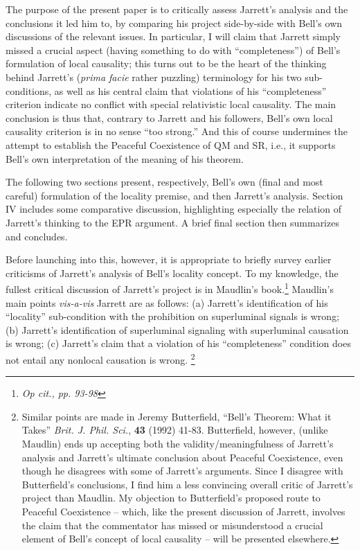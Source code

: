 \documentclass[12pt]{article}
\begin{document}
The purpose of the present paper is to critically assess
Jarrett's analysis and
the conclusions it led him to, by comparing his project side-by-side
with Bell's own discussions of the relevant issues.  In particular, I
will claim that Jarrett simply missed a crucial aspect (having
something to do with ``completeness'') of Bell's
formulation of local causality; this turns out to be the heart of the
thinking behind Jarrett's (\emph{prima facie} rather puzzling) terminology
for his two sub-conditions, as well as his central claim that
violations of his ``completeness'' criterion indicate no conflict with
special relativistic local causality.  The main conclusion is thus
that, contrary to Jarrett and his followers, Bell's own local 
causality criterion is in no sense ``too strong.''  And this of course
undermines the attempt to establish the Peaceful Coexistence of QM and
SR, i.e., it supports Bell's own interpretation of the meaning of his
theorem. 

The following two
sections present, respectively, Bell's own (final and most careful)
formulation of the locality premise, and then Jarrett's analysis.  
Section IV includes some comparative discussion, highlighting
especially the relation of Jarrett's thinking to the EPR argument.  A
brief final section then summarizes and concludes.

Before launching into this, however, it is appropriate to briefly
survey earlier criticisms of Jarrett's analysis of Bell's locality
concept.  To my knowledge, the fullest critical discussion of
Jarrett's project is in Maudlin's book.\footnote{\emph{Op cit., 
pp. 93-98}}  
Maudlin's main points \emph{vis-a-vis} Jarrett are as follows:  
(a) Jarrett's identification of his ``locality'' sub-condition with
the prohibition on superluminal signals is wrong; (b) Jarrett's
identification of superluminal signaling with superluminal causation
is wrong; (c) Jarrett's claim that a violation of his ``completeness''
condition does not entail any nonlocal causation is wrong.%
\footnote{Similar points are made in Jeremy Butterfield, ``Bell's
  Theorem: What it Takes'' \emph{Brit. J. Phil. Sci.}, {\bf{43}}
  (1992) 41-83.  Butterfield, however, (unlike Maudlin) ends up
  accepting both the validity/meaningfulness of Jarrett's analysis and
  Jarrett's ultimate conclusion about Peaceful Coexistence, 
  even though he disagrees with some of Jarrett's arguments.  Since I
  disagree with Butterfield's conclusions, I find him a less
  convincing overall critic of Jarrett's project than Maudlin.  My
  objection to Butterfield's proposed route to Peaceful Coexistence --
  which, like the present discussion of Jarrett, involves the claim 
  that the commentator has missed or misunderstood a crucial element
  of Bell's concept of local causality -- will be presented elsewhere.}
\end{document}

